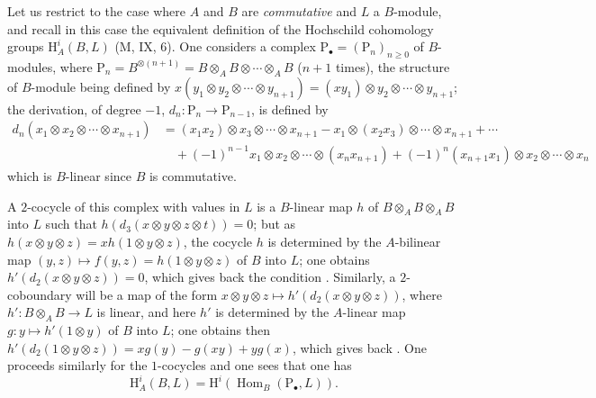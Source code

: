 \begin{env}[18.4.4]
\label{0.18.4.4}
Let us restrict to the case where $A$ and $B$ are \emph{commutative} and $L$ a $B$-module, and recall in this case the equivalent definition of the Hochschild cohomology groups $\mathrm{H}^i_A(B,L)$ (M, IX, 6).
One considers a complex $\mathrm{P}_\bullet=(\mathrm{P}_n)_{n\geqslant 0}$ of $B$-modules, where $\mathrm{P}_n=B^{\otimes(n+1)}=B\otimes_A B\otimes\cdots\otimes_A B$ ($n+1$ times), the structure of $B$-module being defined by $x(y_1\otimes y_2\otimes\cdots\otimes y_{n+1})=(xy_1)\otimes y_2\otimes\cdots\otimes y_{n+1}$; the derivation, of degree $-1$, $d_n:\mathrm{P}_n\to\mathrm{P}_{n-1}$, is defined by
\begin{align*}
  d_n(x_1\otimes x_2\otimes\cdots\otimes x_{n+1})&=(x_1 x_2)\otimes x_3\otimes\cdots\otimes x_{n+1}-x_1\otimes(x_2 x_3)\otimes\cdots\otimes x_{n+1}+\cdots\\
  &\quad +(-1)^{n-1} x_1\otimes x_2\otimes\cdots\otimes(x_n x_{n+1})+(-1)^n(x_{n+1} x_1)\otimes x_2\otimes\cdots\otimes x_n
\end{align*}
which is $B$-linear since $B$ is commutative.

A $2$-cocycle of this complex with values in $L$ is a $B$-linear map $h$ of $B\otimes_A B\otimes_A B$ into $L$ such that $h(d_3(x\otimes y\otimes z\otimes t))=0$; but as $h(x\otimes y\otimes z)=xh(1\otimes y\otimes z)$, the cocycle $h$ is determined by the $A$-bilinear map $(y,z)\mapsto f(y,z)=h(1\otimes y\otimes z)$ of $B$ into $L$; one obtains $h'(d_2(x\otimes y\otimes z))=0$, which gives back the condition .
Similarly, a $2$-coboundary will be a map of the form $x\otimes y\otimes z\mapsto h'(d_2(x\otimes y\otimes z))$, where $h':B\otimes_A B\to L$ is linear, and here $h'$ is determined by the $A$-linear map $g:y\mapsto h'(1\otimes y)$ of $B$ into $L$; one obtains then $h'(d_2(1\otimes y\otimes z))=xg(y)-g(xy)+yg(x)$, which gives back .
One proceeds similarly for the $1$-cocycles and one sees that one has
\begin{equation}
\tag{18.4.4.1}
  \label{0.18.4.4.1}
  \mathrm{H}^i_A(B,L)=\mathrm{H}^i(\operatorname{Hom}_B(\mathrm{P}_\bullet,L)).
\end{equation}
\end{env}

